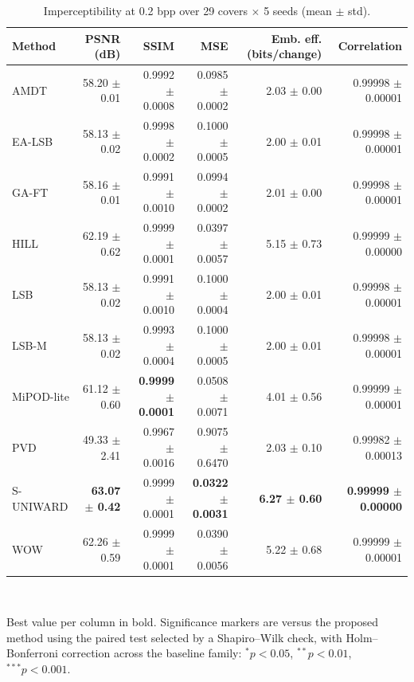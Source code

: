 \begin{table}[!t]
\centering
\caption{Imperceptibility at 0.2 bpp over 29 covers $\times$ 5 seeds (mean $\pm$ std).}
\label{tab:quality}
\footnotesize
\begin{tabular}{lrrrrr}
\toprule
Method & PSNR (dB) & SSIM & MSE & Emb. eff. (bits/change) & Correlation \\
\midrule
AMDT & 58.20 $\pm$ 0.01 & 0.9992 $\pm$ 0.0008 & 0.0985 $\pm$ 0.0002 & 2.03 $\pm$ 0.00 & 0.99998 $\pm$ 0.00001 \\
EA-LSB & 58.13 $\pm$ 0.02 & 0.9998 $\pm$ 0.0002 & 0.1000 $\pm$ 0.0005 & 2.00 $\pm$ 0.01 & 0.99998 $\pm$ 0.00001 \\
GA-FT & 58.16 $\pm$ 0.01 & 0.9991 $\pm$ 0.0010 & 0.0994 $\pm$ 0.0002 & 2.01 $\pm$ 0.00 & 0.99998 $\pm$ 0.00001 \\
HILL & 62.19 $\pm$ 0.62 & 0.9999 $\pm$ 0.0001 & 0.0397 $\pm$ 0.0057 & 5.15 $\pm$ 0.73 & 0.99999 $\pm$ 0.00000 \\
LSB & 58.13 $\pm$ 0.02 & 0.9991 $\pm$ 0.0010 & 0.1000 $\pm$ 0.0004 & 2.00 $\pm$ 0.01 & 0.99998 $\pm$ 0.00001 \\
LSB-M & 58.13 $\pm$ 0.02 & 0.9993 $\pm$ 0.0004 & 0.1000 $\pm$ 0.0005 & 2.00 $\pm$ 0.01 & 0.99998 $\pm$ 0.00001 \\
MiPOD-lite & 61.12 $\pm$ 0.60 & \textbf{0.9999 $\pm$ 0.0001} & 0.0508 $\pm$ 0.0071 & 4.01 $\pm$ 0.56 & 0.99999 $\pm$ 0.00001 \\
PVD & 49.33 $\pm$ 2.41 & 0.9967 $\pm$ 0.0016 & 0.9075 $\pm$ 0.6470 & 2.03 $\pm$ 0.10 & 0.99982 $\pm$ 0.00013 \\
S-UNIWARD & \textbf{63.07 $\pm$ 0.42} & 0.9999 $\pm$ 0.0001 & \textbf{0.0322 $\pm$ 0.0031} & \textbf{6.27 $\pm$ 0.60} & \textbf{0.99999 $\pm$ 0.00000} \\
WOW & 62.26 $\pm$ 0.59 & 0.9999 $\pm$ 0.0001 & 0.0390 $\pm$ 0.0056 & 5.22 $\pm$ 0.68 & 0.99999 $\pm$ 0.00001 \\
\bottomrule
\end{tabular}
\\[2pt] \parbox{\linewidth}{\scriptsize Best value per column in bold. Significance markers are versus the proposed method using the paired test selected by a Shapiro--Wilk check, with Holm--Bonferroni correction across the baseline family: $^{*}p<0.05$, $^{**}p<0.01$, $^{***}p<0.001$.}
\end{table}
